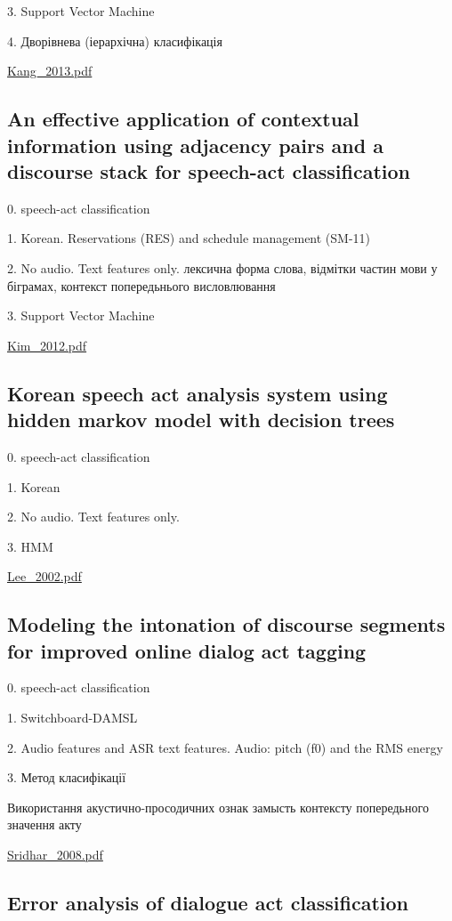 3. Support Vector Machine

4. Дворівнева (іерархічна) класифікація

\url{Kang_2013.pdf}\cite{Kang_2013}

\subsection{An effective application of contextual information using adjacency pairs and a discourse stack for speech-act classification}

0. speech-act classification

1. Korean. Reservations (RES) and schedule management (SM-11)

2. No audio. Text features only. лексична форма слова, відмітки частин мови у біграмах, контекст попередьнього висловлювання

3. Support Vector Machine

\url{Kim_2012.pdf}\cite{Kim_2012}

\subsection{Korean speech act analysis system using hidden markov model with decision trees}

0. speech-act classification

1. Korean

2. No audio. Text features only. 

3. HMM

\url{Lee_2002.pdf}\cite{Lee_2002}

\subsection{Modeling the intonation of discourse segments for improved online dialog act tagging}

0. speech-act classification

1. Switchboard-DAMSL

2. Audio features and ASR text features. Audio: pitch (f0) and the RMS energy

3. Метод класифікації

Використання акустично-просодичних ознак замысть контексту попередьного значення акту

\url{Sridhar_2008.pdf}\cite{Sridhar_2008}

\subsection{Error analysis of dialogue act classification}

